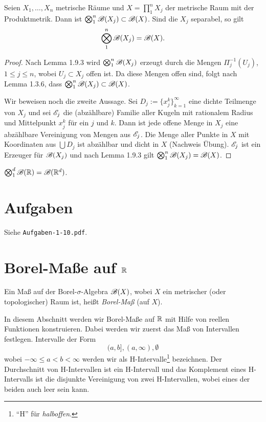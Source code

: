 \begin{thm}
 Seien $X_1, \ldots, X_n$ metrische Räume und $X = \prod_1^n X_j$ der metrische Raum mit der Produktmetrik. Dann ist $\bigotimes_1^n \mathscr{B}(X_j) \subset \mathscr{B}(X)$. Sind die $X_j$ separabel\footnotemark, so gilt 
 \[ \bigotimes_1^n \mathscr{B}(X_j) = \mathscr{B}(X). \]
\end{thm}

\begin{proof}
 Nach Lemma 1.9.3 wird $\bigotimes_1^n \mathscr{B}(X_j)$ erzeugt durch die Mengen $\Pi_j^{-1}( U_j )$, $1 \le j \le n$, wobei $U_j \subset X_j$ offen ist. Da diese Mengen offen sind, folgt nach Lemma 1.3.6, dass $\bigotimes_1^n \mathscr{B}(X_j) \subset \mathscr{B}(X)$.
 
 Wir beweisen noch die zweite Aussage. Sei $D_j := \{ x_j^k \}_{k=1}^\infty$ eine dichte Teilmenge von $X_j$ und sei $\mathscr{E}_j$ die (abzählbare) Familie aller Kugeln mit rationalem Radius und Mittelpunkt $x_j^k$ für ein $j$ und $k$. Dann ist jede offene Menge in $X_j$ eine abzählbare Vereinigung von Mengen aus $\mathscr{E}_j$. Die Menge aller Punkte in $X$ mit Koordinaten aus $\bigcup D_j$ ist abzählbar und dicht in $X$ (Nachweis Übung). $\mathscr{E}_j$ ist ein Erzeuger für $\mathscr{B}(X_j)$ und nach Lemma 1.9.3 gilt $\bigotimes_1^n \mathscr{B}(X_j) = \mathscr{B}(X)$.
\end{proof}

\begin{folg}
 $\bigotimes_1^d \mathscr{B}(\mathbb{R}) = \mathscr{B}(\mathbb{R}^d)$.
\end{folg}

\section{Aufgaben}
Siehe \verb+Aufgaben-1-10.pdf+.

\section{Borel-Maße auf \texorpdfstring{$\mathbb{R}$}{IR}}
Ein Maß auf der Borel-$\sigma$-Algebra $\mathscr{B}(X)$, wobei $X$ ein metrischer (oder topologischer) Raum ist, heißt \emph{Borel-Maß} (auf $X$).

In diesem Abschnitt werden wir Borel-Maße auf $\mathbb{R}$ mit Hilfe von reellen Funktionen konstruieren. Dabei werden wir zuerst das Maß von Intervallen festlegen. Intervalle der Form 
\[ (a,b], (a, \infty), \emptyset \]
wobei $- \infty \le a < b < \infty$ werden wir als H-Intervalle\footnote{``H'' für \emph{halboffen}.} bezeichnen. Der Durchschnitt von H-Intervallen ist ein H-Intervall und das Komplement eines H-Intervalls ist die disjunkte Vereinigung von zwei H-Intervallen, wobei eines der beiden auch leer sein kann.

